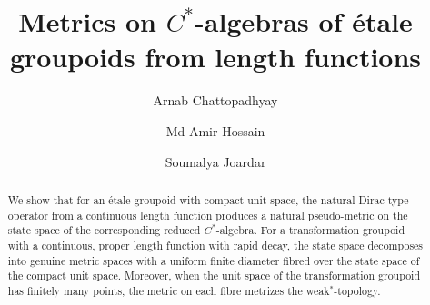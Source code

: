 \documentclass[a4paper,11pt,reqno]{amsart}
\title{Metrics on $C^{\ast}$-algebras of étale groupoids from length functions }
\author[A. Chattopadhyay]{Arnab Chattopadhyay}
\author[Md A. Hossain]{Md Amir Hossain}
\author[S. Joardar]{Soumalya Joardar}
\theoremstyle{plain}
\theoremstyle{named}
\numberwithin{equation}{section}
\begin{document}
			\begin{abstract}	   
		We show that for an étale groupoid with compact unit space, the natural Dirac type operator from a continuous length function produces a natural pseudo-metric on the state space of the corresponding reduced $C^{\ast}$-algebra. For a transformation groupoid with a continuous, proper length function with rapid decay, the state space decomposes into genuine metric spaces with a uniform finite diameter fibred over the state space of the compact unit space. Moreover, when the unit space of the transformation groupoid has finitely many points, the metric on each fibre metrizes the weak$^\ast$-topology. 
			\end{abstract}
			\maketitle
\end{document}
